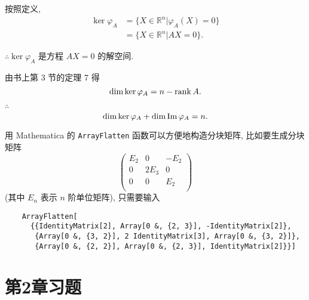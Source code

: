 \documentclass[color=black,device=normal,lang=cn,mode=geye]{elegantnote}
\begin{document}
按照定义,
\begin{align*}
    \ker\varphi_A & =\{X\in\mathbb{R}^n|\varphi_A(X)=0\} \\
    & =\{X\in\mathbb{R}^n|AX=0\}.
\end{align*}

$\therefore\ker\varphi_A$ 是方程 $AX=0$ 的解空间.

由书上第 3 节的定理 7 得
\[\dim\ker\varphi_A=n-\operatorname{rank} A.\]

$\therefore$
\[\dim\ker\varphi_A+\dim\operatorname{Im} \varphi_A=n.\]

用 Mathematica 的 \verb|ArrayFlatten| 函数可以方便地构造分块矩阵, 比如要生成分块矩阵
\[\begin{pmatrix}
    E_2 & 0 & -E_2 \\
    0 & 2E_3 & 0 \\
    0 & 0 & E_2 \\
\end{pmatrix}\]
(其中 $E_n$ 表示 $n$ 阶单位矩阵), 只需要输入
\begin{lstlisting}
    ArrayFlatten[
      {{IdentityMatrix[2], Array[0 &, {2, 3}], -IdentityMatrix[2]},
       {Array[0 &, {3, 2}], 2 IdentityMatrix[3], Array[0 &, {3, 2}]},
       {Array[0 &, {2, 2}], Array[0 &, {2, 3}], IdentityMatrix[2]}}]
\end{lstlisting}
\section{第2章习题}
\end{document}
